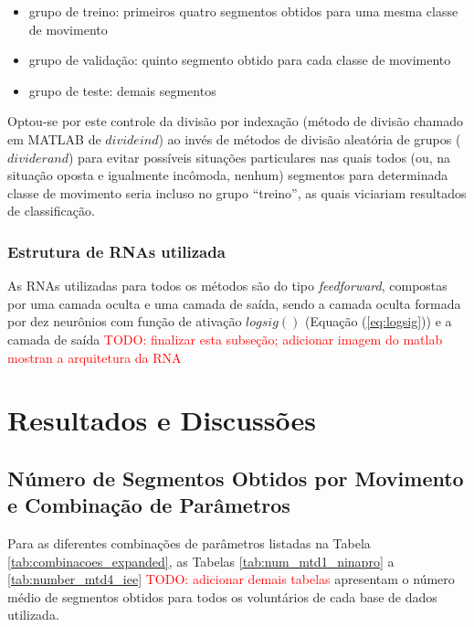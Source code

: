 \begin{itemize}
\item grupo de treino: primeiros quatro segmentos obtidos para uma mesma classe de movimento
\item grupo de validação: quinto segmento obtido para cada classe de movimento
\item grupo de teste: demais segmentos
\end{itemize}

Optou-se por este controle da divisão por indexação (método de divisão chamado em MATLAB de $divideind$) ao invés de métodos de divisão aleatória de grupos ($dividerand$) para evitar possíveis situações particulares nas quais todos (ou, na situação oposta e igualmente incômoda, nenhum) segmentos para determinada classe de movimento seria incluso no grupo ``treino'', as quais viciariam resultados de classificação.

			\subsection{Estrutura de RNAs utilizada}
As RNAs utilizadas para todos os métodos são do tipo \emph{feedforward}, compostas por uma camada oculta e uma camada de saída, sendo a camada oculta formada por dez neurônios com função de ativação $logsig()$ (Equação (\ref{eq:logsig})) e a camada de saída
\textcolor{red}{TODO: finalizar esta subseção; adicionar imagem do matlab mostran a arquitetura da RNA}


	\chapter{Resultados e Discussões}
		\section{Número de Segmentos Obtidos por Movimento e Combinação de Parâmetros}
Para as diferentes combinações de parâmetros listadas na Tabela \ref{tab:combinacoes_expanded}, as Tabelas \ref{tab:num_mtd1_ninapro} a \ref{tab:number_mtd4_iee} \textcolor{red}{TODO: adicionar demais tabelas} apresentam o número médio de segmentos obtidos para todos os voluntários de cada base de dados utilizada.

